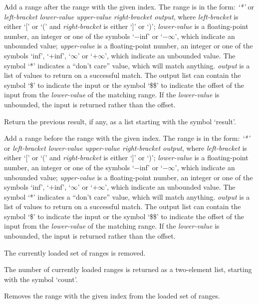   Add a range after the range with the given index.
  The range is in the form: \emph{`*'} or \emph{left-bracket lower-value upper-value right-bracket output}, where
  \emph{left-bracket} is either `[' or `(' and \emph{right-bracket} is either `]' or `)';
  \emph{lower-value} is a floating-point number, an integer or one of the symbols `$-$inf' or
  `$-\infty$', which indicate an unbounded value;
  \emph{upper-value} is a floating-point number, an integer or one of the symbols
  `inf', `$+$inf', `$\infty$' or `$+\infty$', which indicate an unbounded value.
  The symbol `*' indicates a ``don't care'' value, which will match anything.
  \emph{output} is a list of values to return on a successful match.
  The output list can contain the symbol `\$' to indicate the input or the symbol `\$\$' to
  indicate the offset of the input from the \emph{lower-value} of the matching range.
  If the \emph{lower-value} is unbounded, the input is returned rather than the offset.

  Return the previous result, if any, as a list starting with the symbol `result'.

  Add a range before the range with the given index.
  The range is in the form: \emph{`*'} or \emph{left-bracket lower-value upper-value right-bracket output}, where
  \emph{left-bracket} is either `[' or `(' and \emph{right-bracket} is either `]' or `)';
  \emph{lower-value} is a floating-point number, an integer or one of the symbols `$-$inf' or
  `$-\infty$', which indicate an unbounded value;
  \emph{upper-value} is a floating-point number, an integer or one of the symbols
  `inf', `$+$inf', `$\infty$' or `$+\infty$', which indicate an unbounded value.
  The symbol `*' indicates a ``don't care'' value, which will match anything.
  \emph{output} is a list of values to return on a successful match.
  The output list can contain the symbol `\$' to indicate the input or the symbol `\$\$' to
  indicate the offset of the input from the \emph{lower-value} of the matching range.
  If the \emph{lower-value} is unbounded, the input is returned rather than the offset.

  The currently loaded set of ranges is removed.
  
  The number of currently loaded ranges is returned as a two-element list, starting with the symbol
  `count'.
  
  Removes the range with the given index from the loaded set of ranges.

